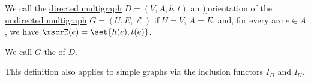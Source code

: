 \begin{definition}\label{def:multigraph_orientation}
  We call the \hyperref[def:directed_multigraph]{directed multigraph} \( D = (V, A, h, t) \) an \term[ru=ориентация (\cite[32]{ЕмеличевИПр1990ТеорияГрафов})]{orientation} of the \hyperref[def:hypergraph/multigraph]{undirected multigraph} \( G = (U, E, \mscrE) \) if \( U = V \), \( A = E \), and, for every arc \( e \in A \), we have \( \mscrE(e) = \set{ h(e), t(e) } \).

  We call \( G \) the  of \( D \).
\end{definition}
\begin{comments}
  \item This definition also applies to simple graphs via the inclusion functors \hyperref[def:graph_functors/directed_inclusion]{\( I_D \)} and \hyperref[def:graph_functors/undirected_inclusion]{\( I_U \)}.
\end{comments}

